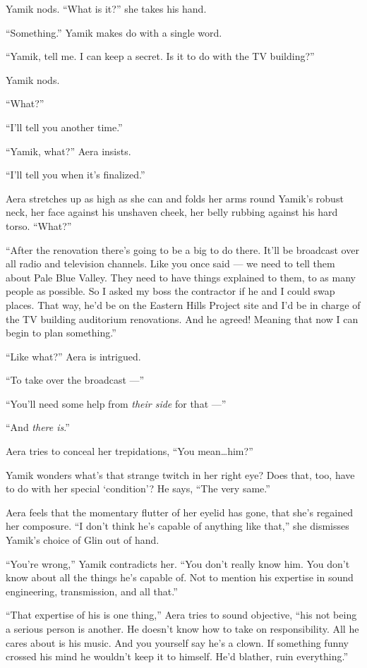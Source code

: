 \documentclass[twoside,11pt,openany]{book}
\begin{document}
Yamik nods.  ``What is it?'' she takes his hand.

``Something.'' Yamik makes do with a single word.

``Yamik, tell me. I can keep a secret. Is it to do with the TV building?''

Yamik nods.

``What?''

``I'll tell you another time.''

``Yamik, what?'' Aera insists.

``I'll tell you when it's finalized.''

Aera stretches up as high as she can and folds her arms round Yamik's robust neck, her face against his unshaven cheek,
her belly rubbing against his hard torso. ``What?''

``After the renovation there's going to be a big to do there. It'll be broadcast over all radio and
television channels. Like you once said --- we need to tell them about Pale Blue Valley. They need to have things
explained to them, to as many people as possible.  So I asked my boss the contractor if he and I could swap places.
That way, he'd be on the Eastern Hills Project site and I'd be in charge of the TV building auditorium renovations. And
he agreed!  Meaning that now I can begin to plan something.''

``Like what?'' Aera is intrigued.

``To take over the broadcast ---''

``You'll need some help from \textit{their side }for that ---''

``And \textit{there is}.''

Aera tries to conceal her trepidations, ``You mean{\ldots}him?''

Yamik wonders what's that strange twitch in her right eye? Does that, too, have to do with her special `condition'? He
says, ``The very same.''

Aera feels that the momentary flutter of her eyelid has gone, that she's regained her composure. ``I don't
think he's capable of anything like that,'' she dismisses Yamik's choice of Glin out of hand.

``You're wrong,'' Yamik contradicts her. ``You don't really know him. You don't
know about all the things he's capable of. Not to mention his expertise in sound engineering, transmission, and all
that.''

``That expertise of his is one thing,'' Aera tries to sound objective, ``his not
being a serious person is another.  He doesn't know how to take on responsibility. All he cares about is his music.
And you yourself say he's a clown. If something funny crossed his mind he wouldn't keep it to himself. He'd blather,
ruin everything.''
\end{document}
